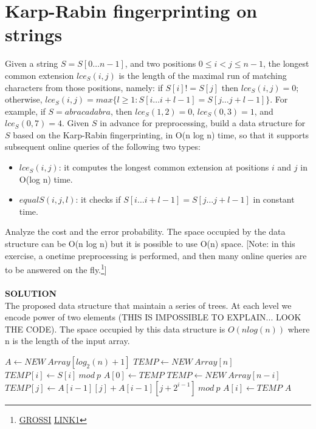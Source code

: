 \documentclass[a4paper]{article}
\begin{document}
\section*{Karp-Rabin fingerprinting on strings}
Given a string $S = S[0 \dots n − 1]$, and two positions $0 \leq i < j \leq n − 1$, the longest common extension $lce_S(i, j)$ is the length of the maximal run of matching characters from those positions, namely: if $S[i] != S[j]$ then $lce_S(i, j) = 0$; otherwise, $lce_S(i, j) =  max \{ \textit{l}\geq 1 : S[i \dots i + \textit{l} − 1] = S[j \dots j + \textit{l} − 1] \}$. For example, if $S = abracadabra$, then $lce_S(1, 2) = 0$, $lce_S(0, 3) = 1$, and $lce_S(0, 7) = 4$. Given $S$ in advance for preprocessing, build a data structure for $S$ based on the Karp-Rabin fingerprinting, in O(n log n) time, so that it supports subsequent online queries of the following two types:
\begin{itemize}
\item $lce_S(i, j)$: it computes the longest common extension at positions $i$ and $j$ in O(log n) time.
\item $equalS(i, j,\textit{l})$: it checks if $S[i \dots i + \textit{l} − 1] = S[j \dots j + \textit{l} − 1]$ in constant time.
\end{itemize}
Analyze the cost and the error probability. The space occupied by the data structure can be O(n log n) but it is possible to use O(n) space. [Note: in this exercise, a onetime preprocessing is performed, and then many online queries are to be answered on the fly.\footnote{\href{http://orbit.dtu.dk/files/118483386/phd366_Vind_SJ.pdf}{GROSSI} \href{https://arxiv.org/pdf/1211.0270.pdf}{LINK1}}]\\
\\
\textbf{SOLUTION}
\\
The proposed data structure that maintain a series of trees. At each level we encode power of two elements (THIS IS IMPOSSIBLE TO EXPLAIN... LOOK THE CODE). The space occupied by this data structure is $O(nlog(n))$ where n is the length of the input array.   
\begin{algorithmic}
\State $A \gets NEW \ Array[log_2(n)+1]$
\State $TEMP \gets NEW \ Array[n]$
\State $TEMP[i] \gets S[i] \ mod \ p$
\EndFor 
\State $A[0] \gets TEMP$
\State $TEMP \gets NEW \ Array[n-i]$ 
\State $TEMP[j] \gets A[i-1][j] + A[i-1][j+2^{i-1}] \ mod \ p$
\EndFor 
\State $A[i] \gets TEMP$
\EndFor 
\State \Return $A$
\EndFunction
\end{algorithmic}
\end{document}
